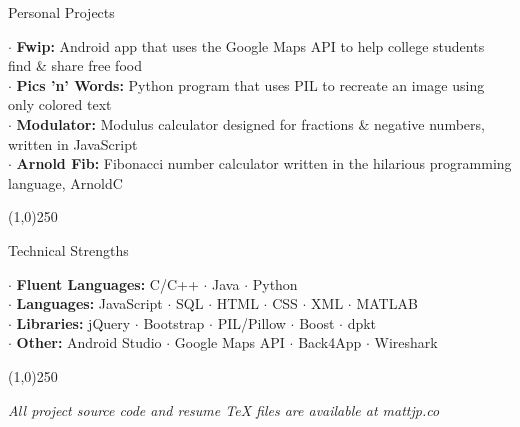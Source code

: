 \documentclass{article}
\begin{document}
{\fontsize{0.75cm}{0.5cm}\selectfont Personal Projects}

\begin{adjustwidth}{1cm}{}
	\begin{spacing}{1}
		$\cdot$ \textbf{Fwip:} Android app that uses the Google Maps API to help college students find \& share free food \\ 
		$\cdot$ \textbf{Pics 'n' Words:} Python program that uses PIL to recreate an image using only colored text\\ 
		$\cdot$ \textbf{Modulator:} Modulus calculator designed for fractions \& negative numbers, written in JavaScript\\
		$\cdot$ \textbf{Arnold Fib:} Fibonacci number calculator written in the hilarious programming language, ArnoldC
	\end{spacing}
\end{adjustwidth}

\vspace*{-0.75cm}

\begin{center}
	\line(1,0){250}
\end{center}

{\fontsize{0.75cm}{0.5cm}\selectfont Technical Strengths}

\begin{adjustwidth}{1cm}{}
	\begin{spacing}{1}
		$\cdot$ \textbf{Fluent Languages:} C/C++ $\cdot$ Java $\cdot$ Python\\ 
		$\cdot$ \textbf{Languages:} JavaScript $\cdot$ SQL $\cdot$ HTML $\cdot$ CSS $\cdot$ XML $\cdot$ MATLAB\\ 
		$\cdot$ \textbf{Libraries:} jQuery $\cdot$ Bootstrap $\cdot$ PIL/Pillow $\cdot$ Boost $\cdot$ dpkt\\
		$\cdot$ \textbf{Other:} Android Studio $\cdot$ Google Maps API $\cdot$ Back4App $\cdot$ Wireshark
	\end{spacing}
\end{adjustwidth}

\vspace*{-0.75cm}

\begin{center}
	\line(1,0){250}
\end{center}

\begin{center}
	\emph{All project source code and resume TeX files are available at mattjp.co}
\end{center}
\end{document}
